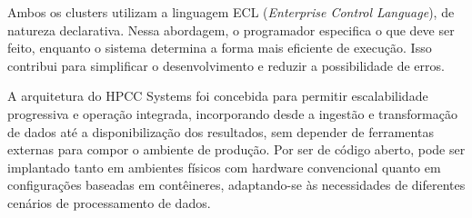 Ambos os clusters utilizam a linguagem ECL (\textit{Enterprise Control Language}), de natureza declarativa. Nessa abordagem, o programador especifica o que deve ser feito, enquanto o sistema determina a forma mais eficiente de execução. Isso contribui para simplificar o desenvolvimento e reduzir a possibilidade de erros.

A arquitetura do HPCC Systems foi concebida para permitir escalabilidade progressiva e operação integrada, incorporando desde a ingestão e transformação de dados até a disponibilização dos resultados, sem depender de ferramentas externas para compor o ambiente de produção. Por ser de código aberto, pode ser implantado tanto em ambientes físicos com hardware convencional quanto em configurações baseadas em contêineres, adaptando-se às necessidades de diferentes cenários de processamento de dados.
